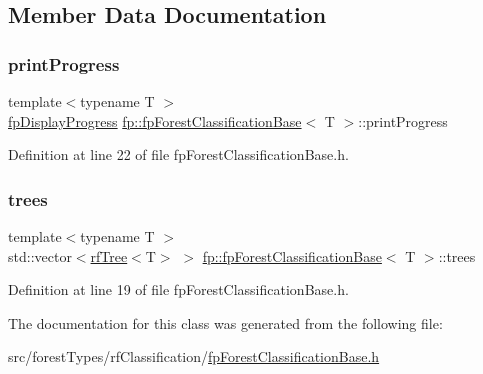 \subsection{Member Data Documentation}
\mbox{\label{classfp_1_1fpForestClassificationBase_a21148775a113092d6929e0d28e351a2c}} 
\subsubsection{\texorpdfstring{print\+Progress}{printProgress}}
{\footnotesize\ttfamily template$<$typename T $>$ \\
\hyperlink{classfp_1_1fpDisplayProgress}{fp\+Display\+Progress} \hyperlink{classfp_1_1fpForestClassificationBase}{fp\+::fp\+Forest\+Classification\+Base}$<$ T $>$\+::print\+Progress}



Definition at line 22 of file fp\+Forest\+Classification\+Base.\+h.

\mbox{\label{classfp_1_1fpForestClassificationBase_a51482a6c95c4b3cb42627f029c2d4662}} 
\subsubsection{\texorpdfstring{trees}{trees}}
{\footnotesize\ttfamily template$<$typename T $>$ \\
std\+::vector$<$\hyperlink{classfp_1_1rfTree}{rf\+Tree}$<$T$>$ $>$ \hyperlink{classfp_1_1fpForestClassificationBase}{fp\+::fp\+Forest\+Classification\+Base}$<$ T $>$\+::trees\hspace{0.3cm}{\ttfamily [protected]}}



Definition at line 19 of file fp\+Forest\+Classification\+Base.\+h.



The documentation for this class was generated from the following file\+:\begin{DoxyCompactItemize}
\item 
src/forest\+Types/rf\+Classification/\hyperlink{fpForestClassificationBase_8h}{fp\+Forest\+Classification\+Base.\+h}\end{DoxyCompactItemize}
